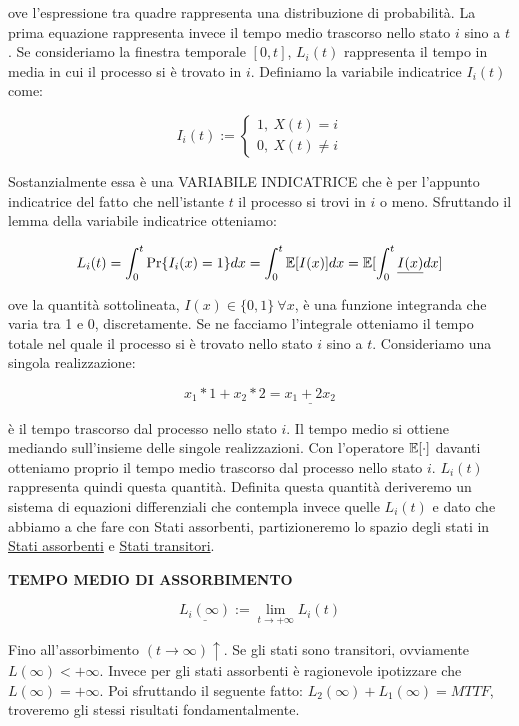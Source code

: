 ove l'espressione tra quadre rappresenta una distribuzione di probabilità. La prima equazione rappresenta invece il tempo medio trascorso nello stato $i$ sino a $t$. Se consideriamo la finestra temporale $[0,t]$, $L_i(t)$ rappresenta il tempo in media in cui il processo si è trovato in $i$. Definiamo la variabile indicatrice $I_i(t)$ come:

\[
	I_i(t) := \left\{
	\begin{aligned}
	1,\ X(t)=i\\
	0,\ X(t)\neq i
	\end{aligned}
	\right.
\]

Sostanzialmente essa è una VARIABILE INDICATRICE che è per l'appunto indicatrice del fatto che nell'istante $t$ il processo si trovi in $i$ o meno. Sfruttando il lemma della variabile indicatrice otteniamo:

\[
	L_i(t) = \int_0^t{\Pr\{I_i(x)=1\}dx} = \int_0^t{\operatorname{\mathbb{E}}[I(x)]dx} = \operatorname{\mathbb{E}}[\int_0^t{\underline{I(x)}dx}]
\]

ove la quantità sottolineata, $I(x)\in\{0,1\}\ \forall x$, è una funzione integranda che varia tra 1 e 0, discretamente. Se ne facciamo l'integrale otteniamo il tempo totale nel quale il processo si è trovato nello stato $i$ sino a $t$. Consideriamo una singola realizzazione:

\[
	x_1*1 + x_2*2 = \underline{x_1+2x_2}
\]

è il tempo trascorso dal processo nello stato $i$. Il tempo medio si ottiene mediando sull'insieme delle singole realizzazioni. Con l'operatore $\operatorname{\mathbb{E}}[\mathord{\cdot}]$ davanti otteniamo proprio il tempo medio trascorso dal processo nello stato $i$. $L_i(t)$ rappresenta quindi questa quantità. Definita questa quantità deriveremo un sistema di equazioni differenziali che contempla invece quelle $L_i(t)$ e dato che abbiamo a che fare con Stati assorbenti, partizioneremo lo spazio degli stati in \underline{Stati assorbenti} e \underline{Stati transitori}.

\begin{defn}{\textbf{TEMPO MEDIO DI ASSORBIMENTO}}

\[
	\underline{L_i(\infty)} := \lim_{t\to +\infty}{L_i(t)}
\]

\end{defn}

Fino all'assorbimento $(t\to \infty)\uparrow$. Se gli stati sono transitori, ovviamente $L(\infty)<+\infty$. Invece per gli stati assorbenti è ragionevole ipotizzare che $L(\infty)=+\infty$. Poi sfruttando il seguente fatto: $L_2(\infty)+L_1(\infty)=MTTF$, troveremo gli stessi risultati fondamentalmente.


